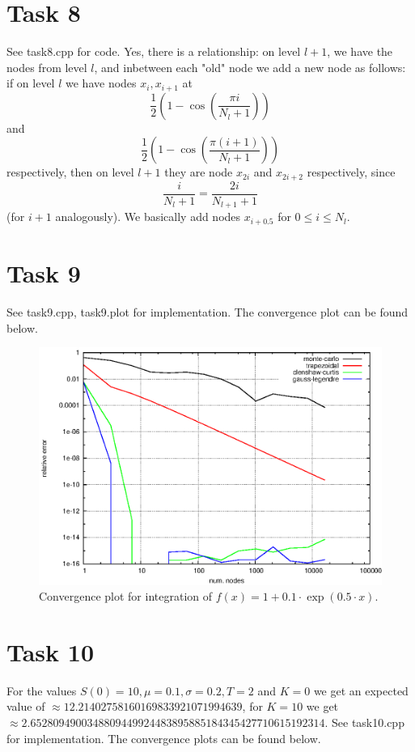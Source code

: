 \documentclass[]{article}
\begin{document}
\section*{Task 8} See task8.cpp for code. Yes, there is a relationship: on level
$l+1$, we have the nodes from level $l$, and inbetween each "old" node we add a
new node as follows: if on level $l$ we have nodes $x_i,x_{i+1}$ at
\[ \dfrac{1}{2}\left(1-\cos\left(\dfrac{\pi i}{N_l+1}\right)\right)\]
 and
\[\dfrac{1}{2}\left(1-\cos\left(\dfrac{\pi(i+1)}{N_l+1}\right)\right)\]
 respectively, then on level $l+1$ they are node $x_{2i}$ and $x_{2i+2}$ respectively, since
\[\dfrac{i}{N_l+1}=\dfrac{2i}{N_{l+1}+1}\]
 (for $i+1$ analogously). We basically add nodes  $x_{i+0.5}$ for $0\le i \le
 N_l$.

\section*{Task 9}
See task9.cpp,
task9.plot for implementation. The convergence plot can be found below.

\begin{figure}[!ht]
\centering
\includegraphics{task9Plot}
\caption{Convergence plot for integration of $f(x)=1+0.1\cdot\exp(0.5\cdot x)$.}
\label{fig:Task9}
\end{figure}
\clearpage

\section*{Task 10} For the values
$S(0)=10,\mu=0.1,\sigma=0.2,T=2$ and $K=0$ we get an expected value of $\approx
12.21402758160169833921071994639$, for $K=10$ we get $\approx
2.6528094900348809449924483895885184345427710615192314$. See task10.cpp for implementation. The convergence plots can be found below.
\end{document}
